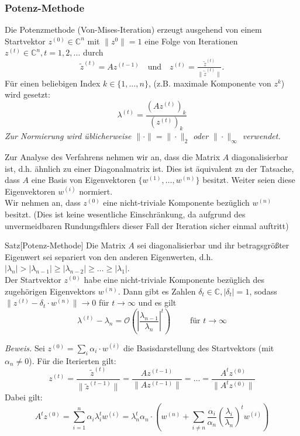 \subsubsection{Potenz-Methode}
\begin{defbox}
    Die Potenzmethode (Von-Mises-Iteration) erzeugt ausgehend von einem Startvektor $z^{(0)}\in\mathbb{C}^n$ mit
    $\|z^0\|=1$ eine Folge von Iterationen $z^{(t)}\in\mathbb{C}^n, t=1,2,\dotsc$ durch 
    \[\tilde{z}^{(t)}=Az^{(t-1)} \quad\text{und}\quad z^{(t)} = \tfrac{\tilde{z}^{(t)}}{\|\tilde{z}^{(t)}\|}.\]
    Für einen beliebigen  Index $k\in\{1,\dotsc,n\}$, (z.B. maximale Komponente von $z^k$) wird gesetzt:
    \[\lambda^{(t)} = \dfrac{(Az^{(t)})_k}{(z^{(t)})_k}\]
    \textit{Zur Normierung wird üblicherweise $\|\cdot\|=\|\cdot\|_2$ oder $\|\cdot\|_\infty$ verwendet.} 
\end{defbox}
Zur Analyse des Verfahrens nehmen wir an, dass die Matrix $A$ diagonalisierbar ist, d.h. ähnlich zu einer 
Diagonalmatrix ist. Dies ist äquivalent zu der Tatsache, dass $A$ eine Basis von Eigenvektoren 
$\{w^{(1)},\dotsc,w^{(n)}\}$ besitzt. Weiter seien diese Eigenvektoren $w^{(i)}$ normiert. \\
Wir nehmen an, dass $z^{(0)}$ eine nicht-triviale Komponente bezüglich $w^{(n)}$ besitzt. 
(Dies ist keine wesentliche Einschränkung, da aufgrund des unvermeidbaren Rundungsfhlers dieser Fall der 
Iteration sicher einmal auftritt)
\newpage
\begin{thmbox}{Satz}[Potenz-Methode]
    Die Matrix $A$ sei diagonalisierbar und ihr betragsgrößter Eigenwert sei separiert von den anderen 
    Eigenwerten, d.h. $|\lambda_n|>|\lambda_{n-1}|\geq|\lambda_{n-2}|\geq\dotsc\geq|\lambda_1|$. \\ 
    Der Startvektor $z^{(0)}$ habe eine nicht-triviale Komponente bezüglich des zugehörigen Eigenvektors $w^{(n)}$.
    Dann gibt es Zahlen $\delta_t\in\mathbb{C}, |\delta_t|=1$, 
    sodass $\|z^{(t)}-\delta_t\cdot w^{(n)}\|\rightarrow 0$ für $t\rightarrow\infty$ und es gilt
    \[\lambda^{(t)}-\lambda_n = \mathcal{O}\left(\left|\dfrac{\lambda_{n-1}}{\lambda_n}\right|^t\right)\qquad 
    \text{ für } t\rightarrow \infty\]
\end{thmbox}
\textit{Beweis.} Sei $z^{(0)}=\sum_i \alpha_i\cdot w^{(i)}$ die Basisdarstellung des Startvektors 
(mit $\alpha_n\neq 0$). Für die Iterierten gilt:
\[z^{(t)} = \dfrac{\tilde{z}^{(t)}}{\|\tilde{z}^{(t-1)}\|} = \dfrac{Az^{(t-1)}}{\|Az^{(t-1)}\|} 
= \dotsc = \dfrac{A^tz^{(0)}}{\|A^tz^{(0)}\|}\]
Dabei gilt:
\[A^tz^{(0)} = \sum_{i=1}^{n}\alpha_i\lambda_i^tw^{(i)} = \lambda_n^t \alpha_n\cdot\left(w^{(n)} + 
\sum_{i\neq n} \dfrac{\alpha_i}{\alpha_n}\left(\dfrac{\lambda_i}{\lambda_n}\right)^t w^{(i)}\right)\]
